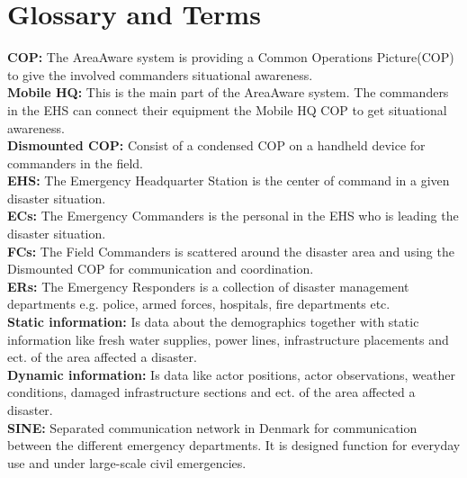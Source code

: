 \appendix
\label{chp_appendix}
\chapter{Glossary and Terms}

\textbf{COP:} The AreaAware system is providing a Common Operations Picture(COP) to give the involved commanders situational awareness.\\

\noindent \textbf{Mobile HQ:} This is the main part of the AreaAware system. The commanders in the EHS can connect their equipment the Mobile HQ COP to get situational awareness.\\

\noindent \textbf{Dismounted COP:} Consist of a condensed COP on a handheld device for commanders in the field.\\

\noindent \textbf{EHS:} The Emergency Headquarter Station is the center of command in a given disaster situation.\\

\noindent \textbf{ECs:} The Emergency Commanders is the personal in the EHS who is leading the disaster situation.\\

\noindent \textbf{FCs:} The Field Commanders is scattered around the disaster area and using the Dismounted COP for communication and coordination.\\

\noindent \textbf{ERs:} The Emergency Responders is a collection of disaster management departments e.g. police, armed forces, hospitals, fire departments etc.\\

\noindent \textbf{Static information:} Is data about the demographics together with static information like fresh water supplies, power lines, infrastructure placements and ect. of the area affected a disaster.\\

\noindent \textbf{Dynamic information:} Is data like actor positions, actor observations, weather conditions, damaged infrastructure sections and ect. of the area affected a disaster.\\

\noindent \textbf{SINE:} Separated communication network in Denmark for communication between the different emergency departments. It is designed function for everyday use and under large-scale civil emergencies.\\